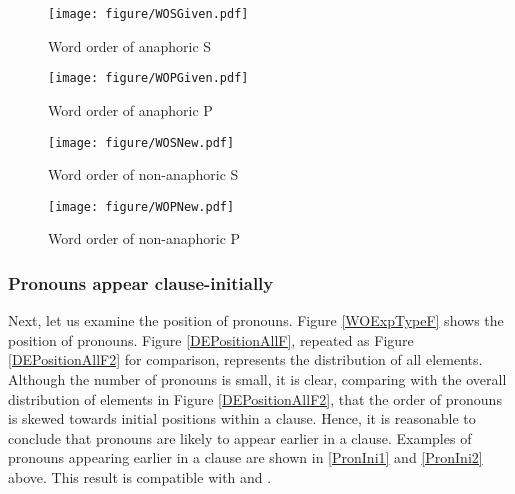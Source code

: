 \begin{figure}
	\begin{center}
	\texttt{[image: figure/WOSGiven.pdf]}
	\caption{Word order of anaphoric S}
	\label{WOSGivenF}
	\end{center}
\end{figure}
\begin{figure}
	\begin{center}
	\texttt{[image: figure/WOPGiven.pdf]}
	\caption{Word order of anaphoric P}
	\label{WOPGivenF}
	\end{center}
\end{figure}
\begin{figure}
	\begin{center}
	\texttt{[image: figure/WOSNew.pdf]}
	\caption{Word order of non-anaphoric S}
	\label{WOSNewF}
	\end{center}
\end{figure}
\begin{figure}
	\begin{center}
	\texttt{[image: figure/WOPNew.pdf]}
	\caption{Word order of non-anaphoric P}
	\label{WOPNewF}
	\end{center}
\end{figure}

\subsubsection{Pronouns appear clause-initially}\label{WO:ClauseInit:Ident:Pron}

Next, let us examine the position of pronouns.
Figure \ref{WOExpTypeF} shows the position of pronouns.
Figure \ref{DEPositionAllF}, repeated as Figure \ref{DEPositionAllF2} for comparison,
represents the distribution of all elements.
Although the number of pronouns is small,
it is clear, comparing with the overall distribution of elements in Figure \ref{DEPositionAllF2}, that
the order of pronouns is skewed towards initial positions within a clause.
Hence, it is reasonable to conclude that
pronouns are likely to appear earlier in a clause.
Examples of pronouns appearing earlier in a clause are shown in \ref{PronIni1} and \ref{PronIni2} above.
This result is compatible with  and .



